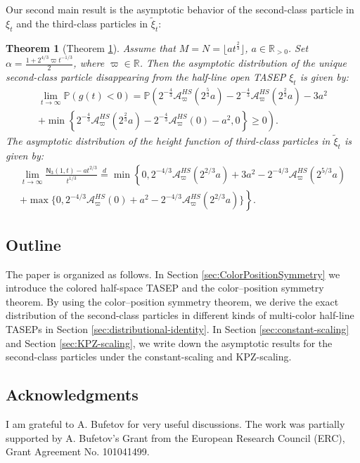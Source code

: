 \documentclass[12pt,a4paper]{amsart}
\newtheorem{theorem}{Theorem} %
\theoremstyle{remark}
\numberwithin{equation}{section} \numberwithin{theorem}{section}
\begin{document}
Our second main result is the asymptotic behavior of the second-class particle in $\xi_t$ and the third-class particles in $\tilde{\xi}_{t}$:
\begin{theorem}[Theorem \ref{thm:two-shocks-KPZ-5}]
\label{thm:two-shocks-KPZ-5}
Assume that $M=N=\lfloor at^{\frac23} \rfloor$, $a\in \mathbb{R}_{>0}$. Set $\alpha = \frac{1+2^{4/3}\varpi t^{-1/3}}{2}$, where $\varpi \in \mathbb{R}$. Then the asymptotic distribution of the unique second-class particle disappearing from the half-line open TASEP $\xi_t$ is given by:
\begin{multline}
\label{eq:two-shocks-disappear}
\lim_{t \to \infty}\mathbb{P}(g(t)<0)  = \mathbb{P}\left(2^{-\frac{4}{3}}\mathcal{A}_{\varpi}^{HS}(2^{\frac53}a)-2^{-\frac{4}{3}}\mathcal{A}_{\varpi}^{HS}(2^{\frac23}a) - 3a^2\right.\\
\left. + \min\left\{2^{-\frac{4}{3}}\mathcal{A}_{\varpi}^{HS}(2^{\frac23}a)-2^{-\frac{4}{3}}\mathcal{A}_{\varpi}^{HS}(0) - a^2,0 \right\} \geq 0\right).
\end{multline}
The asymptotic distribution of the height function of third-class particles in $\tilde{\xi}_t$ is given by:
\begin{multline}
\label{eq:two-shocks-kpz}
\lim_{t\to\infty}\frac{\mathsf{N}_{3} (1,t)-at^{2/3}}{t^{1/3}} \stackrel{d}{=} \min \left\{0, 2^{-4/3}\mathcal{A}_{\varpi}^{HS}(2^{2/3}a)+3a^2 - 2^{-4/3}\mathcal{A}_{\varpi}^{HS}(2^{5/3}a) \right.\\
\left. +\max\{0, 2^{-4/3}\mathcal{A}_{\varpi}^{HS}(0)+a^2 - 2^{-4/3}\mathcal{A}_{\varpi}^{HS}(2^{2/3}a)\}\right\}.
\end{multline}
\end{theorem}

\subsection{Outline}
The paper is organized as follows. In Section \ref{sec:ColorPositionSymmetry} we introduce the colored half-space TASEP and the color--position symmetry theorem. By using the color--position symmetry theorem, we derive the exact distribution of the second-class particles in different kinds of multi-color half-line TASEPs in Section \ref{sec:distributional-identity}. In Section \ref{sec:constant-scaling} and Section \ref{sec:KPZ-scaling}, we write down the asymptotic results for the second-class particles under the constant-scaling and KPZ-scaling.

\subsection*{Acknowledgments} 
I am grateful to A. Bufetov for very useful discussions. The work was partially supported by A. Bufetov's Grant from the European Research Council (ERC), Grant Agreement No. 101041499.
\end{document}

